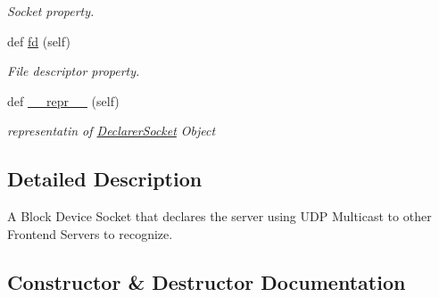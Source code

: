 \begin{DoxyCompactItemize}
\begin{DoxyCompactList}\small\item\em Socket property. \end{DoxyCompactList}\item 
\mbox{\label{class_r_a_i_d5_1_1block__device_1_1pollables_1_1declarer__socket_1_1_declarer_socket_a389a320c5f7132d02c6be9b268bc247f}} 
def \hyperlink{class_r_a_i_d5_1_1block__device_1_1pollables_1_1declarer__socket_1_1_declarer_socket_a389a320c5f7132d02c6be9b268bc247f}{fd} (self)
\begin{DoxyCompactList}\small\item\em File descriptor property. \end{DoxyCompactList}\item 
def \hyperlink{class_r_a_i_d5_1_1block__device_1_1pollables_1_1declarer__socket_1_1_declarer_socket_a86b05b1856efb3051b78b6562934ac24}{\+\_\+\+\_\+repr\+\_\+\+\_\+} (self)
\begin{DoxyCompactList}\small\item\em representatin of \hyperlink{class_r_a_i_d5_1_1block__device_1_1pollables_1_1declarer__socket_1_1_declarer_socket}{Declarer\+Socket} Object \end{DoxyCompactList}\end{DoxyCompactItemize}


\subsection{Detailed Description}
A Block Device Socket that declares the server using U\+DP Multicast to other Frontend Servers to recognize. 

\subsection{Constructor \& Destructor Documentation}
\mbox{\label{class_r_a_i_d5_1_1block__device_1_1pollables_1_1declarer__socket_1_1_declarer_socket_a0da7f9ba5573de93db76bd439e2aea6a}} 
